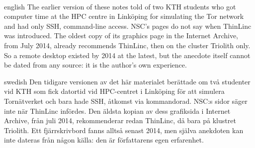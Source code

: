 \paragraph{} %
\begin{onlyin}{english} %
The earlier version of these notes told of two KTH students who got
computer time at the HPC centre in Linköping for simulating the Tor
network and had only SSH, command-line access.  NSC's pages do not say
when ThinLinc was introduced.  The oldest copy of its graphics page in
the Internet Archive, from July 2014, already recommends ThinLinc, then
on the cluster Triolith only\autocite{NSCGraphics2014}.  So a remote
desktop existed by 2014 at the latest, but the anecdote itself cannot be
dated from any source: it is the author's own experience.
\end{onlyin}
\begin{onlyin}{swedish}
Den tidigare versionen av det här materialet berättade om två studenter
vid KTH som fick datortid vid HPC-centret i Linköping för att simulera
Tornätverket och bara hade SSH, åtkomst via kommandorad.  NSC:s sidor
säger inte när ThinLinc infördes.  Den äldsta kopian av dess grafiksida i
Internet Archive, från juli 2014, rekommenderar redan ThinLinc, då bara
på klustret Triolith\autocite{NSCGraphics2014}.  Ett fjärrskrivbord
fanns alltså senast 2014, men själva anekdoten kan inte dateras från
någon källa: den är författarens egen erfarenhet.
\end{onlyin}

\section{} %

